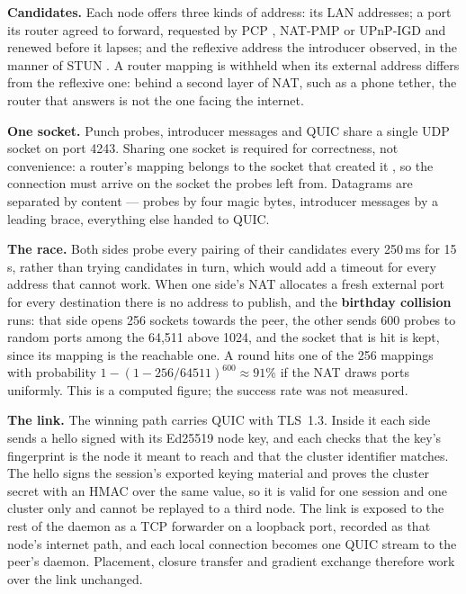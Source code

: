 \textbf{Candidates.} Each node offers three kinds of address: its LAN addresses;
a port its router agreed to forward, requested by PCP \cite{rfc6887}, NAT-PMP
\cite{rfc6886} or UPnP-IGD \cite{upnpigd} and renewed before it lapses; and the reflexive address the introducer observed, in the
manner of STUN \cite{rfc8489}. A router mapping is withheld when its external
address differs from the reflexive one: behind a second layer of NAT, such as a
phone tether, the router that answers is not the one facing the internet.

\textbf{One socket.} Punch probes, introducer messages and QUIC share a single UDP
socket on port 4243. Sharing one socket is required for correctness, not convenience: a router's
mapping belongs to the socket that created it \cite{ford2005p2p}, so the
connection must arrive on the socket the probes left from. Datagrams are
separated by content --- probes by four magic bytes, introducer messages by a
leading brace, everything else handed to QUIC.

\textbf{The race.} Both sides probe every pairing of their candidates every
250\,ms for 15\,s, rather than trying candidates in turn, which would
add a timeout for every address that cannot work. When one side's NAT allocates
a fresh external port for every destination there is no address to publish, and
the \textbf{birthday collision} \cite{anderson2020nat} runs: that side opens 256
sockets towards the peer, the other sends 600 probes to random ports among the
64{,}511 above 1024, and the socket that is hit is kept, since its mapping is
the reachable one. A round hits one of the 256 mappings with probability
$1-(1-256/64511)^{600} \approx 91\%$ if the NAT draws ports uniformly. This
is a computed figure; the success rate was not measured.

\textbf{The link.} The winning path carries QUIC \cite{rfc9000} with TLS~1.3.
Inside it each side sends a hello signed with its Ed25519 node key, and each
checks that the key's fingerprint is the node it meant to reach and that the
cluster identifier matches. The hello signs the session's exported keying
material \cite{rfc5705} and proves the cluster secret with an HMAC
\cite{rfc2104} over the same value, so it is valid for one session and one
cluster only and cannot be replayed to a third node. The link is exposed to the
rest of the daemon as a TCP forwarder on a loopback port, recorded as that
node's internet path, and each local connection becomes one QUIC stream to the
peer's daemon. Placement, closure transfer and gradient exchange therefore work
over the link unchanged.

